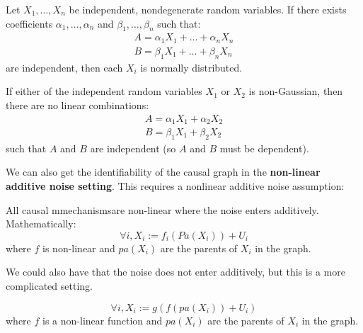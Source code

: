 \begin{theorem}
    Let $X_1, \dots, X_n$ be independent, nondegenerate random variables. If there
    exists coefficients $\alpha_1, \dots, \alpha_n$ and $\beta_1, \dots, \beta_n$ such that:
    \begin{equation*}
        \begin{split}
            A = \alpha_1X_1 + \dots + \alpha_nX_n \\
            B = \beta_1X_1 + \dots + \beta_nX_n
        \end{split}
    \end{equation*}
    are independent, then each $X_i$ is normally distributed.
\end{theorem}
\begin{corollary}
    If either of the independent random variables $X_1$ or $X_2$ is non-Gaussian,
    then there are no linear combinations:
    \begin{equation}
        \begin{split}
            A = \alpha_1X_1 + \alpha_2X_2 \\
            B = \beta_1X_1 + \beta_2X_2
        \end{split}
    \end{equation}
    such that $A$ and $B$ are independent (so $A$ and $B$ must be dependent).
\end{corollary}
We can also get the identifiability of the causal graph in the \textbf{non-linear additive
    noise setting}. This requires a nonlinear additive noise assumption:
\begin{definition}
    All causal mmechanismsare non-linear where the noise enters additively.
    Mathematically:
    \begin{equation}
        \forall i, X_i := f_i(Pa(X_i)) + U_i
    \end{equation}
    where $f$ is non-linear and $pa(X_i)$ are the parents of $X_i$ in the graph.
\end{definition}
We could also have that the noise does not enter additively, but this is a more
complicated setting.
\begin{definition}
    \begin{equation}
        \forall i, X_i := g(f(pa(X_i)) + U_i)
    \end{equation}
    where $f$ is a non-linear function and $pa(X_i)$ are the parents of $X_i$ in
    the graph.
\end{definition}
